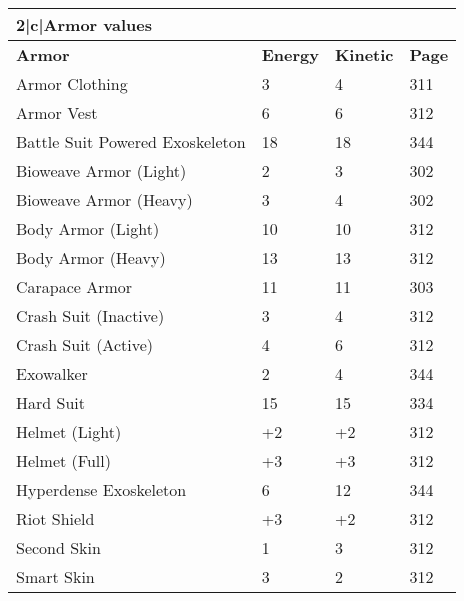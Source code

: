 \begin{table} \begin{tabular}{|l|l|l|l|} \hline

\hline{2}{|c|}{\textbf{Armor values}}	\\ \hline

\textbf{Armor}	&\textbf{Energy} &\textbf{Kinetic}	&\textbf{Page} \\ \hline

Armor Clothing	&3	&4	&311	\\ \hline

Armor Vest	&6	&6	&312	\\ \hline

Battle Suit Powered Exoskeleton	&18	&18	&344	\\ \hline

Bioweave Armor (Light)	&2	&3	&302	\\ \hline

Bioweave Armor (Heavy)	&3	&4	&302	\\ \hline

Body Armor (Light)	&10	&10	&312	\\ \hline

Body Armor (Heavy)	&13	&13	&312	\\ \hline

Carapace Armor	&11	&11	&303	\\ \hline

Crash Suit (Inactive)	&3	&4	&312	\\ \hline

Crash Suit (Active)	&4	&6	&312	\\ \hline

Exowalker	&2	&4	&344	\\ \hline

Hard Suit	&15	&15	&334	\\ \hline

Helmet (Light)	&+2	&+2	&312	\\ \hline

Helmet (Full)	&+3	&+3	&312	\\ \hline

Hyperdense Exoskeleton	&6	&12	&344	\\ \hline

Riot Shield	&+3	&+2	&312	\\ \hline

Second Skin	&1	&3	&312	\\ \hline

Smart Skin	&3	&2	&312	\\ \hline


\end{tabular}
\end{table}

